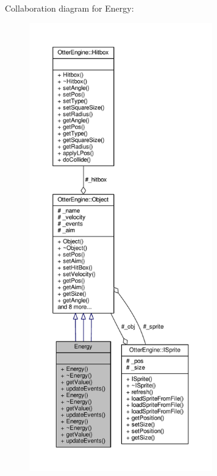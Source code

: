 Collaboration diagram for Energy\+:\nopagebreak
\begin{figure}[H]
\begin{center}
\leavevmode
\includegraphics[height=550pt]{d7/db0/class_energy__coll__graph}
\end{center}
\end{figure}

